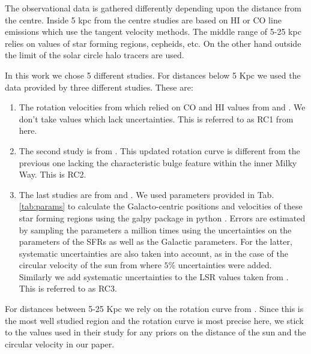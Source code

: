 \documentclass[fleqn,usenatbib]{mnras}
\begin{document}
The observational data is gathered differently depending upon the distance from the centre. Inside 5 kpc from the centre studies are based on HI or CO line emissions which use the tangent velocity methods. The middle range of 5-25 kpc relies on values of star forming regions, cepheids, etc. On the other hand outside the limit of the solar circle halo tracers are used. 

In this work we chose 5 different studies. For distances below 5 Kpc we used the data provided by three different studies. These are:
\begin{enumerate}
    
    \item The rotation velocities from \citet{2009PASJ...61..227S} which relied on CO and HI values from \citet{1978A&A....63....7B} and \citet{1985ApJ...295..422C}. We don't take values which lack uncertainties. This is referred to as RC1 from here.
    \item The second study is from \citet{2021PASJ...73L..19S}. This updated rotation curve is different from the previous one lacking the characteristic bulge feature within the inner Milky Way. This is RC2.
    \item The last studies are from \citet{2014ApJ...783..130R} and \citet{2019ApJ...885..131R}. We used parameters provided in Tab. \ref{tab:params} to calculate the Galacto-centric positions and velocities of these star forming regions using the galpy package in python \citet{2015ApJS..216...29B}. Errors are estimated by sampling the parameters a million times using the uncertainties on the parameters of the SFRs as well as the Galactic parameters. For the latter, systematic uncertainties are also taken into account, as in the case of the circular velocity of the sun from  where $5\%$ uncertainties were added. Similarly we add systematic uncertainties to the LSR values taken from \citet{2013ApJ...779..115B}. This is referred to as RC3.
\end{enumerate}


For distances between 5-25 Kpc we rely on the rotation curve from \citet{2019ApJ...871..120E}. Since this is the most well studied region and the rotation curve is most precise here, we stick to the values used in their study for any priors on the distance of the sun and the circular velocity in our paper. 
\end{document}
